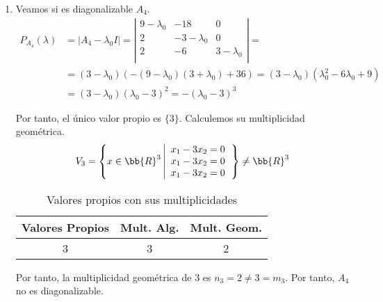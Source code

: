 \begin{ejercicio}
\begin{enumerate}
\begin{enumerate}
            \item Veamos si es diagonalizable $A_4$.\\
            \begin{equation*}\begin{split}
                P_{A_4}(\lambda) & = |A_4-\lambda_0 I| = \left| \begin{array}{ccc}
                9-\lambda_0 & -18 & 0 \\
                2 & -3-\lambda_0 & 0 \\
                2 & -6 & 3-\lambda_0 \\
                \end{array}\right| =\\
                & = (3-\lambda_0)\left(-(9-\lambda_0)(3+\lambda_0)+36\right) = (3-\lambda_0)(\lambda_0^2-6\lambda_0+9) \\
                &= (3-\lambda_0)(\lambda_0-3)^2 = -(\lambda_0-3)^3
            \end{split}\end{equation*}

            Por tanto, el único valor propio es $\{3\}$. Calculemos su multiplicidad geométrica.
            \begin{equation*}
            V_3 = \left\{x\in\bb{R}^3 \left| \begin{array}{c}
                 x_1-3x_2=0  \\
                 x_1-3x_2 = 0 \\
                 x_1-3x_2 = 0
            \end{array}\right.\right\} \neq \bb{R}^3
            \end{equation*}

            \begin{table}[H]
                \centering
                \begin{tabular}{c|c|c}
                    Valores Propios & Mult. Alg. & Mult. Geom. \\ \hline 
                    3 & 3 & 2\\
                \end{tabular}
                \caption{Valores propios con sus multiplicidades}
            \end{table}

            Por tanto, la multiplicidad geométrica de $3$ es $n_3=2 \neq 3 = m_3$. Por tanto, $A_4$ no es diagonalizable.


\end{enumerate}
\end{enumerate}
\end{ejercicio}
